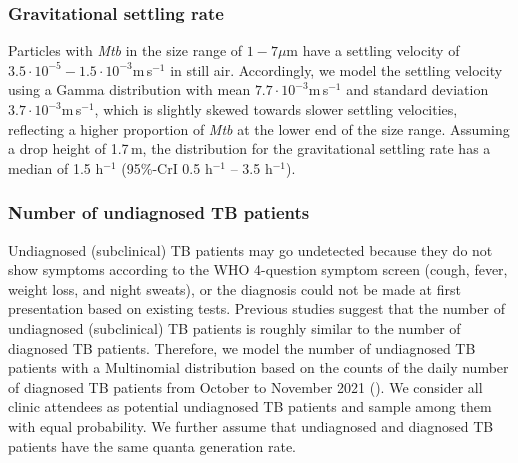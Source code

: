 \documentclass[fleqn,11pt]{wlscirep_supp}
\begin{document}
\subsubsection{Gravitational settling rate}

Particles with \emph{Mtb} in the size range of $1-7\mu$m\cite{Fennelly2020Lancet} have a settling velocity of $3.5\cdot 10^{-5}-1.5\cdot 10^{-3}$m\,s$^{-1}$ in still air\cite{Vuorinen2020SafSci}. Accordingly, we model the settling velocity using a Gamma distribution with mean $7.7\cdot 10^{-3}$m\,s$^{-1}$ and standard deviation $3.7\cdot 10^{-3}$m\,s$^{-1}$, which is slightly skewed towards slower settling velocities, reflecting a higher proportion of \emph{Mtb} at the lower end of the size range\cite{Fennelly2020Lancet}. Assuming a drop height of 1.7\,m, the distribution for the gravitational settling rate has a median of 1.5 h$^{-1}$ (95\%-CrI 0.5 h$^{-1}$ – 3.5 h$^{-1}$).

\subsubsection{Number of undiagnosed TB patients}

Undiagnosed (subclinical) TB patients may go undetected because they do not show symptoms according to the WHO 4-question symptom screen (cough, fever, weight loss, and night sweats)\cite{Berhanu2023CID}, or the diagnosis could not be made at first presentation based on existing tests\cite{Patterson2024PNAS}. Previous studies suggest that the number of undiagnosed (subclinical) TB patients is roughly similar to the number of diagnosed TB patients\cite{Berhanu2023CID,Moyo2022LancetID}. Therefore, we model the number of undiagnosed TB patients with a Multinomial distribution based on the counts of the daily number of diagnosed TB patients from October to November 2021 (). We consider all clinic attendees as potential undiagnosed TB patients and sample among them with equal probability. We further assume that undiagnosed and diagnosed TB patients have the same quanta generation rate.
\end{document}
